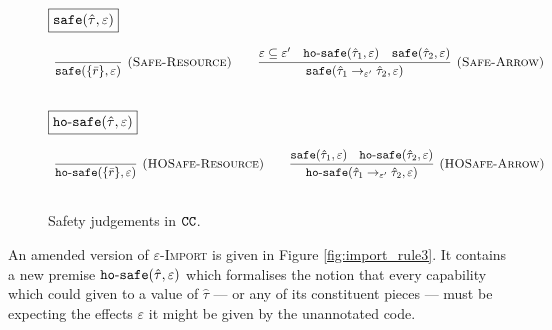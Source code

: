 \begin{figure}[h]

\noindent
$\fbox{$\mathtt{safe}(\hat \tau, \varepsilon)$}$

\[
\begin{array}{c}

\infer[\textsc{(Safe-Resource)}]
	{ \kwa{safe}(\{ \bar r \}, \varepsilon) }
	{} 
\hspace{5ex}
	
\infer[\textsc{(Safe-Arrow)}]
	{\kwa{safe}(\hat \tau_1 \rightarrow_{\varepsilon'} \hat \tau_2, \varepsilon)}
	{\varepsilon \subseteq \varepsilon' & \kwa{ho \hyphen safe}(\hat \tau_1, \varepsilon) & \kwa{safe}(\hat \tau_2, \varepsilon)} \\[3ex]

\end{array}
\]

\noindent
$\fbox{$\mathtt{ho \hbox{-} safe}(\hat \tau, \varepsilon)$}$

\[
\begin{array}{c}

\infer[\textsc{(HOSafe-Resource)}]
	{ \kwa{ho \hyphen safe}( \{ \bar r \}, \varepsilon)} 
	{}
\hspace{5ex}

\infer[\textsc{(HOSafe-Arrow)}]
	{ \kwa{ho \hyphen safe}( \hat \tau_1 \rightarrow_{\varepsilon'} \hat \tau_2, \varepsilon ) }
	{ \kwa{safe}(\hat \tau_1, \varepsilon)  & \kwa{ho \hyphen safe}(\hat \tau_2, \varepsilon) }\\[3ex]

\end{array}
\]

\vspace{-7pt}
\caption{Safety judgements in $\mathtt{CC}$.}
\label{fig:safe_defns}
\end{figure}

An amended version of \textsc{$\varepsilon$-Import} is given in Figure \ref{fig:import_rule3}. It contains a new premise $\mathtt{ho \hbox{-} safe}(\hat \tau, \varepsilon)$ which formalises the notion that every capability which could given to a value of $\hat \tau$ --- or any of its constituent pieces --- must be expecting the effects $\varepsilon$ it might be given by the unannotated code.

